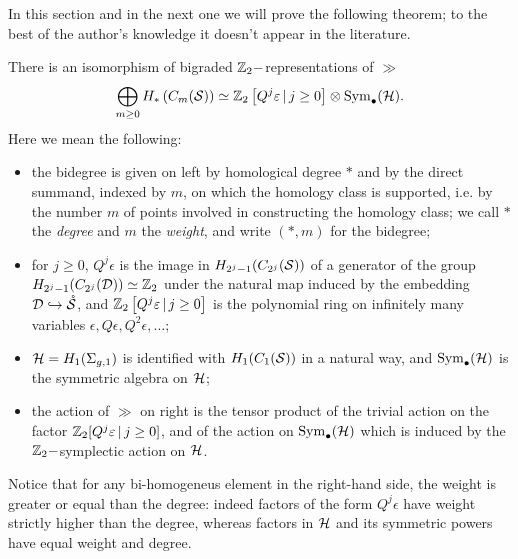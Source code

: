 In this section and in the next one we will prove the following theorem; to the best of the author's knowledge
it doesn't appear in the literature.
\begin{thm}
 \label{thm:Hbms*as*ggrep}
 There is an isomorphism of bigraded $\Z_2-$representations of $\gg$
 \[
  \bigoplus_{m\geq 0} H_*\pa{\cms}\simeq \Z_2\left[Q^j\epsilon\,|\, j\geq 0\right]\otimes\Sym_{\bullet}(\H).
 \]
 Here we mean the following:
 \begin{itemize}
  \item the bidegree is given on left by homological degree $*$ and by the direct summand,
  indexed by $m$,
  on which the homology class is supported, i.e. by the number $m$ of points
  involved in constructing the homology class; we call $*$ the \emph{degree} and $m$ the \emph{weight},
  and write $(*,m)$ for the bidegree;
  \item for $j\geq 0$, $Q^j\epsilon$ is the image in $H_{2^j-1}(C_{2^j}(\S))$ of a generator
  of the group $H_{2^j-1}(C_{2^j}(\D))\simeq \Z_2$ 
  under the natural map induced by the embedding $\D\hookrightarrow\mrS$,
  and $\Z_2\left[Q^j\epsilon\,|\, j\geq 0\right]$ is the polynomial ring on
  infinitely many variables $\epsilon,Q\epsilon,Q^2\epsilon,\dots$;
  \item $\H=H_1(\sg)$ is identified with $H_1(C_1(\S))$ in a natural way, and $\Sym_{\bullet}(\H)$ is the
  symmetric algebra on $\H$;
  \item the action of $\gg$ on right is the tensor product of the trivial action
  on the factor $\Z_2[Q^j\epsilon\,|\, j\geq 0]$, and of the action on
  $\Sym_{\bullet}(\H)$ which is induced by the $\Z_2-$symplectic action on $\H$.
  \end{itemize}
\end{thm}
Notice that for any bi-homogeneus element in the right-hand side, the weight is greater or equal than
the degree: indeed factors of the form $Q^j\epsilon$ have weight strictly higher than the degree,
whereas factors in $\H$ and its symmetric powers have equal weight and degree.
  
